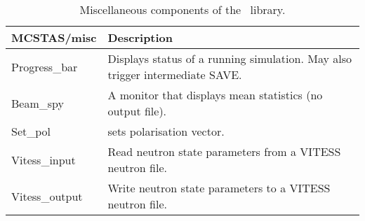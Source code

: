 \begin{table}
  \begin{center}
    {\let\my=\\
    \begin{tabular}{|p{}|p{}|}
      \hline
       {\bf MCSTAS/misc} & Description \\
       \hline
 Progress\_bar     &  Displays status of a running simulation.
                      May also trigger intermediate SAVE.\\
 Beam\_spy         & A monitor that displays mean statistics (no output file). \\
 Set\_pol          & sets polarisation vector. \\
 Vitess\_input     &   Read neutron state parameters from a VITESS neutron file.\\
 Vitess\_output    &  Write neutron state parameters to a VITESS neutron file.\\
      \hline
    \end{tabular}
    \caption{Miscellaneous components of the \MCS\ library.}
    \label{t:comp-misc}
    }
  \end{center}
\end{table}

